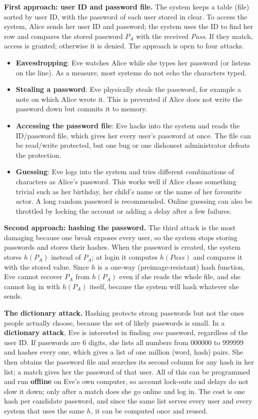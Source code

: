 \textbf{First approach: user ID and password file.} The system keeps a table (file) sorted by user ID, with the password of each user stored in clear. To access the system, Alice sends her user ID and password; the system uses the ID to find her row and compares the stored password $P_A$ with the received \textit{Pass}. If they match, access is granted; otherwise it is denied. The approach is open to four attacks.
\begin{itemize}
  \item \textbf{Eavesdropping}: Eve watches Alice while she types her password (or listens on the line). As a measure, most systems do not echo the characters typed.
  \item \textbf{Stealing a password}: Eve physically steals the password, for example a note on which Alice wrote it. This is prevented if Alice does not write the password down but commits it to memory.
  \item \textbf{Accessing the password file}: Eve hacks into the system and reads the ID/password file, which gives her every user's password at once. The file can be read/write protected, but one bug or one dishonest administrator defeats the protection.
  \item \textbf{Guessing}: Eve logs into the system and tries different combinations of characters as Alice's password. This works well if Alice chose something trivial such as her birthday, her child's name or the name of her favourite actor. A long random password is recommended. Online guessing can also be throttled by locking the account or adding a delay after a few failures.
\end{itemize}

\textbf{Second approach: hashing the password.} The third attack is the most damaging because one break exposes every user, so the system stops storing passwords and stores their hashes. When the password is created, the system stores $h(P_A)$ instead of $P_A$; at login it computes $h(\mathit{Pass})$ and compares it with the stored value. Since $h$ is a one-way (preimage-resistant) hash function, Eve cannot recover $P_A$ from $h(P_A)$ even if she reads the whole file, and she cannot log in with $h(P_A)$ itself, because the system will hash whatever she sends.

\textbf{The dictionary attack.} Hashing protects strong passwords but not the ones people actually choose, because the set of likely passwords is small. In a \textbf{dictionary attack}, Eve is interested in finding \emph{one} password, regardless of the user ID. If passwords are 6 digits, she lists all numbers from 000000 to 999999 and hashes every one, which gives a list of one million (word, hash) pairs. She then obtains the password file and searches its second column for any hash in her list; a match gives her the password of that user. All of this can be programmed and run \textbf{offline} on Eve's own computer, so account lock-outs and delays do not slow it down; only after a match does she go online and log in. The cost is one hash per candidate password, and since the same list serves every user and every system that uses the same $h$, it can be computed once and reused.

